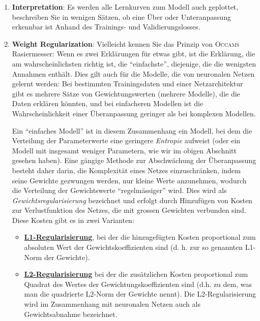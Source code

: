 \documentclass[11pt,a4paper,headinclude]{scrartcl}
\begin{document}
\begin{Aufgabe}
\begin{enumerate}
\item \textbf{Interpretation}: Es werden alle Lernkurven zum Modell auch geplottet, beschreiben Sie in wenigen Sätzen, ob eine Über oder Unteranpassung erkennbar ist Anhand des Trainings- und Validierungslosses.	
\item \textbf{Weight Regularization}: Vielleicht kennen Sie das Prinzip von \textsc{Occams} Rasiermesser: Wenn es zwei Erklärungen für etwas gibt, ist die Erklärung, die am wahrscheinlichsten richtig ist, die "`einfachste"', diejenige, die die wenigsten Annahmen enthält. Dies gilt auch für die Modelle, die von neuronalen Netzen gelernt werden: Bei bestimmten Trainingsdaten und einer Netzarchitektur gibt es mehrere Sätze von Gewichtungswerten (mehrere Modelle), die die Daten erklären könnten, und bei einfacheren Modellen ist die Wahrscheinlichkeit einer Überanpassung geringer als bei komplexen Modellen.

Ein "`einfaches Modell"' ist in diesem Zusammenhang ein Modell, bei dem die Verteilung der Parameterwerte eine geringere \emph{Entropie} aufweist (oder ein Modell mit insgesamt weniger Parametern, wie wir im obigen Abschnitt gesehen haben). Eine gängige Methode zur Abschwächung der Überanpassung besteht daher darin, die Komplexität eines Netzes einzuschränken, indem seine Gewichte gezwungen werden, nur kleine Werte anzunehmen, wodurch die Verteilung der Gewichtswerte "`regelmässiger"' wird. Dies wird als \emph{Gewichtsregularisierung} bezeichnet und erfolgt durch Hinzufügen von Kosten zur Verlustfunktion des Netzes, die mit grossen Gewichten verbunden sind. Diese Kosten gibt es in zwei Varianten:

\begin{itemize}
	\item \href{https://developers.google.com/machine-learning/glossary/#L1_regularization}{\textbf{L1-Regularisierung}}, bei der die hinzugefügten Kosten proportional zum absoluten Wert der Gewichtskoeffizienten sind (d. h. zur so genannten L1-Norm der Gewichte).
	
	\item \href{https://developers.google.com/machine-learning/glossary/#L2_regularization}{\textbf{L2-Regularisierung}} bei der die zusätzlichen Kosten proportional zum Quadrat des Wertes der Gewichtungskoeffizienten sind (d.h. zu dem, was man die quadrierte L2-Norm der Gewichte nennt). Die L2-Regularisierung wird im Zusammenhang mit neuronalen Netzen auch als Gewichtsabnahme bezeichnet. 

\end{itemize}
	

\end{enumerate}
\end{Aufgabe}
\end{document}
